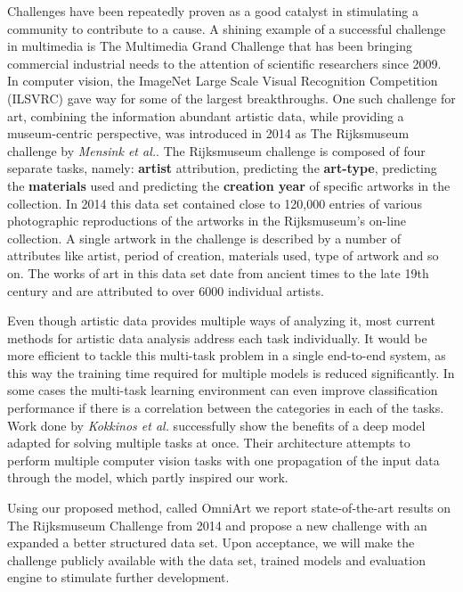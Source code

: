 \documentclass[sigconf]{acmart}
\begin{document}
Challenges have been repeatedly proven as a good catalyst in stimulating a community to contribute to a cause. A shining example of a successful challenge in multimedia is The Multimedia Grand Challenge \cite{snoek2011academia} that has been bringing commercial industrial needs to the attention of scientific researchers since 2009. In computer vision, the ImageNet Large Scale Visual Recognition Competition (ILSVRC) gave way for some of the largest breakthroughs. One such challenge for art, combining the information abundant artistic data, while providing a museum-centric perspective, was introduced in 2014 as The Rijksmuseum challenge by \textit{Mensink et al.}\cite{mensink2014rijksmuseum}. The Rijksmuseum challenge is composed of four separate tasks, namely: \textbf{artist} attribution, predicting the \textbf{art-type}, predicting the \textbf{materials} used and predicting the \textbf{creation year} of specific artworks in the collection. In 2014 this data set contained close to 120,000 entries of various photographic reproductions of the artworks in the Rijksmuseum's on-line collection. A single artwork in the challenge is described by a number of attributes like artist, period of creation, materials used, type of artwork and so on. The works of art in this data set date from ancient times to the late 19th century and are attributed to over 6000 individual artists.

Even though artistic data provides multiple ways of analyzing it, most current methods for artistic data analysis \cite{bar2014classification, karayev2013recognizing, elgammal2015quantifying, Roman-Rangel2016, gatys2016image, guccluturk2016convolutional} address each task individually. It would be more efficient to tackle this multi-task problem in a single end-to-end system, as this way the training time required for multiple models is reduced significantly. In some cases the multi-task learning environment can even improve classification performance if there is a correlation between the categories in each of the tasks. Work done by \textit{Kokkinos et al.}\cite{DBLP:journals/corr/Kokkinos16} successfully show the benefits of a deep model adapted for solving multiple tasks at once. Their architecture attempts to perform multiple computer vision tasks with one propagation of the input data through the model, which partly inspired our work. 

Using our proposed method, called OmniArt we report state-of-the-art results on The Rijksmuseum Challenge from 2014 and propose a new challenge with an expanded a better structured data set. Upon acceptance, we will make the challenge publicly available with the data set, trained models and evaluation engine to stimulate further development.
\end{document}
